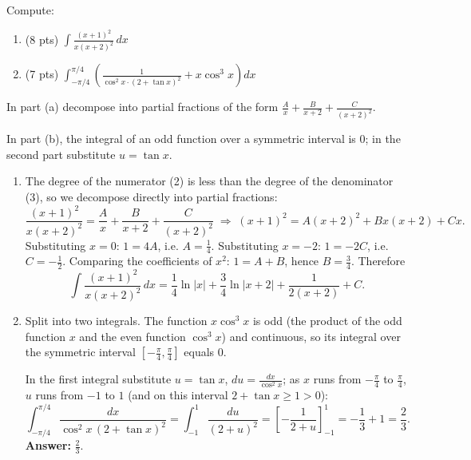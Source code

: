 
\begin{question}
Compute:
\begin{enumerate}
  \item[a.] (8 pts) $\displaystyle\int\frac{(x+1)^2}{x(x+2)^2}\,dx$
  \item[b.] (7 pts) $\displaystyle\int_{-\pi/4}^{\pi/4}\left(\frac{1}{\cos^2x\cdot(2+\tan x)^2}+x\cos^3x\right)dx$
\end{enumerate}
\end{question}

\begin{hint}
In part (a) decompose into partial fractions of the form $\frac{A}{x}+\frac{B}{x+2}+\frac{C}{(x+2)^2}$.
\end{hint}

\begin{hint}
In part (b), the integral of an odd function over a symmetric interval is $0$; in the second part substitute $u=\tan x$.
\end{hint}

\begin{solution}
\begin{enumerate}
  \item[a.] The degree of the numerator (2) is less than the degree of the denominator (3), so we decompose directly into partial fractions:
  \[ \frac{(x+1)^2}{x(x+2)^2}=\frac{A}{x}+\frac{B}{x+2}+\frac{C}{(x+2)^2}
  \;\Longrightarrow\; (x+1)^2=A(x+2)^2+Bx(x+2)+Cx. \]
  Substituting $x=0$: $1=4A$, i.e. $A=\frac14$. Substituting $x=-2$: $1=-2C$, i.e. $C=-\frac12$. Comparing the coefficients of $x^2$: $1=A+B$, hence $B=\frac34$. Therefore
  \[ \int\frac{(x+1)^2}{x(x+2)^2}\,dx=\frac14\ln|x|+\frac34\ln|x+2|+\frac{1}{2(x+2)}+C. \]
  \item[b.] Split into two integrals. The function $x\cos^3x$ is odd (the product of the odd function $x$ and the even function $\cos^3x$) and continuous, so its integral over the symmetric interval $[-\frac\pi4,\frac\pi4]$ equals $0$.

  In the first integral substitute $u=\tan x$, $du=\frac{dx}{\cos^2x}$; as $x$ runs from $-\frac\pi4$ to $\frac\pi4$, $u$ runs from $-1$ to $1$ (and on this interval $2+\tan x\ge1>0$):
  \[ \int_{-\pi/4}^{\pi/4}\frac{dx}{\cos^2x\,(2+\tan x)^2}=\int_{-1}^{1}\frac{du}{(2+u)^2}=\left[-\frac{1}{2+u}\right]_{-1}^{1}=-\frac13+1=\frac23. \]
  \textbf{Answer:} $\frac23$.
\end{enumerate}
\end{solution}
